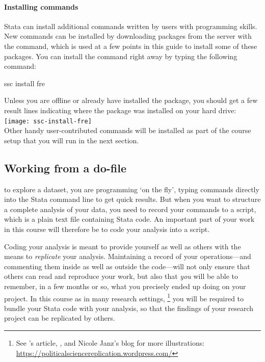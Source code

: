%
%
\paragraph{Installing commands}%

Stata can install additional commands written by users with programming skills. New commands can be installed by downloading packages from the \SSC server with the  command, which is used at a few points in this guide to install some of these packages. You can install the  command right away by typing the following command:%
  
\begin{docspec}
  ssc install fre
\end{docspec}
  
Unless you are offline or already have installed the  package, you should get a few result lines indicating where the package was installed on your hard drive:\\[1em]%
  
\texttt{[image: ssc-install-fre]}\\[1em]
  
Other handy user-contributed commands will be installed as part of the course setup that you will run in the next section.%

%
%
%
\subsection{Working from a do-file}%
  \label{sec:do-files}%

 to explore a dataset, you are programming `on the fly', typing commands directly into the Stata command line to get quick results. But when you want to structure a complete analysis of your data, you need to record your commands to a script, which is a plain text file containing Stata code. An important part of your work in this course will therefore be to code your analysis into a script.%
%

Coding your analysis is meant to provide yourself as well as others with the means to \emph{replicate} your analysis. Maintaining a record of your operations—and commenting them inside as well as outside the code—will not only ensure that others can read and reproduce your work, but also that \emph{you} will be able to remember, in a few months or so, what you precisely ended up doing on your project. In this course as in many research settings,%
  \footnote{See \citeauthor{King:1995}'s article, , and Nicole Janz's blog for more illustrations: \url{https://politicalsciencereplication.wordpress.com/}} %
  you will be required to bundle your Stata code with your analysis, so that the findings of your research project can be replicated by others. %

